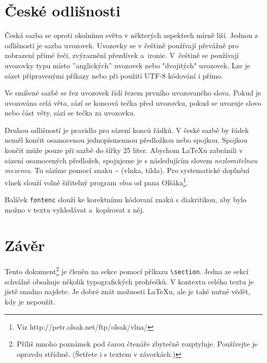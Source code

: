 \documentclass[a4paper, twocolumn]{article}
\begin{document}
\section{České odlišnosti}
Česká sazba se oproti okolnímu světu v některých aspektech mírně liší. Jednou z odlišností je sazba uvozovek. Uvozovky se v češtině používají převážně pro zobrazení přímé řeči, zvýraznění přezdívek a~ironie. V~češtině se používají uvozovky typu  místo ''anglických'' uvozovek nebo "dvojitých" uvozovek. Lze je sázet připravenými příkazy nebo při použití UTF-8 kódování i přímo.

Ve smíšené sazbě se řez uvozovek řídí řezem prvního uvozovaného slova. Pokud je uvozována celá věta, sází se koncová tečka před uvozovku, pokud se uvozuje slovo nebo část věty, sází se tečka za uvozovku.

Druhou odlišností je pravidlo pro sázení konců řádků. V české sazbě by řádek neměl končit osamocenou jednopísmennou předložkou nebo spojkou. Spojkou  končit může pouze při sazbě do šířky 25 liter. Abychom \LaTeX u zabránili v sázení osamocených předložek, spojujeme je s následujícím slovem \emph{nezlomitelnou mezerou}. Tu sázíme pomocí znaku \~{} (vlnka, tilda). Pro systematické doplnění vlnek slouží volně šiřitelný program \emph{vlna} od pana Olšáka\footnote{Viz http://petr.olsak.net/ftp/olsak/vlna/}.

Balíček \texttt{fontenc} slouží ke korektnímu kódovaní znaků s diakritikou, aby bylo možno v textu vyhledávat a~kopírovat z něj.

\section{Závěr}
Tento dokument\footnote{Příliš mnoho poznámek pod čarou čtenáře zbytečně rozptyluje. Používejte je opravdu střídmě. (Šetřete i s textem v závorkách.)} je členěn na sekce pomocí příkazu \verb|\section|. Jedna ze sekcí schválně obsahuje několik typografických prohřešků. V kontextu celého textu je jistě snadno najdete. Je dobré znát možnosti \LaTeX u, ale je také nutné vědět, kdy je nepoužít.
\end{document}
